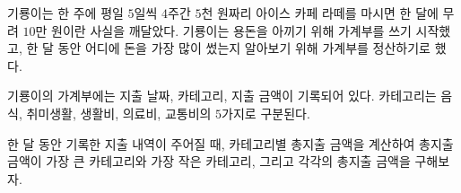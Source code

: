 기룡이는 한 주에 평일 $5$일씩 $4$주간 $5$천 원짜리 아이스 카페 라떼를 마시면 한 달에 무려 $10$만 원이란 사실을 깨달았다. 기룡이는 용돈을 아끼기 위해 가계부를 쓰기 시작했고, 한 달 동안 어디에 돈을 가장 많이 썼는지 알아보기 위해 가계부를 정산하기로 했다.

기룡이의 가계부에는 지출 날짜, 카테고리, 지출 금액이 기록되어 있다. 카테고리는 음식, 취미생활, 생활비, 의료비, 교통비의 $5$가지로 구분된다.

한 달 동안 기록한 지출 내역이 주어질 때, 카테고리별 총지출 금액을 계산하여 총지출 금액이 가장 큰 카테고리와 가장 작은 카테고리, 그리고 각각의 총지출 금액을 구해보자.
